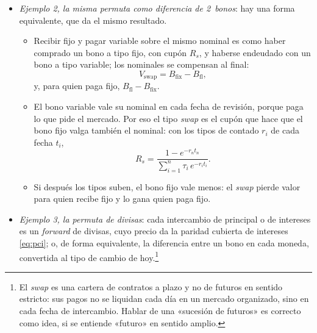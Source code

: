 \documentclass[11pt]{article}
\begin{document}
\begin{itemize}
\begin{itemize}
  \item El pago neto de cada fecha es el de \eqref{eq:pago-swap} con ese tipo, $\mathrm{VN}\,(R_{F,i}-R_s)\,\tau_i$, y el \emph{swap} vale la suma de esos pagos descontados.
  \item Si los tipos a plazo están por encima de $R_s$, el \emph{swap} tiene valor positivo para quien paga fijo; si están por debajo, para quien recibe fijo.
  \end{itemize}
\item \emph{Ejemplo 2, la misma permuta como diferencia de 2~bonos}: hay una forma equivalente, que da el mismo resultado\nocite{Hull2022Options}.
  \begin{itemize}
  \item Recibir fijo y pagar variable sobre el mismo nominal es como haber comprado un bono a tipo fijo, con cupón $R_s$, y haberse endeudado con un bono a tipo variable; los nominales se compensan al final:
  \begin{equation}\label{eq:valor-swap}
  V_{\mathrm{swap}}=B_{\mathrm{fix}}-B_{\mathrm{fl}},
  \end{equation}
  y, para quien paga fijo, $B_{\mathrm{fl}}-B_{\mathrm{fix}}$.
  \item El bono variable vale su nominal en cada fecha de revisión, porque paga lo que pide el mercado. Por eso el tipo \emph{swap} es el cupón que hace que el bono fijo valga también el nominal: con los tipos de contado $r_i$ de cada fecha $t_i$,
  \begin{equation}\label{eq:tipo-swap}
  R_s=\frac{1-e^{-r_nt_n}}{\sum_{i=1}^{n}\tau_i\,e^{-r_it_i}}.
  \end{equation}
  \item Si después los tipos suben, el bono fijo vale menos: el \emph{swap} pierde valor para quien recibe fijo y lo gana quien paga fijo.
  \end{itemize}
\item \emph{Ejemplo 3, la permuta de divisas}: cada intercambio de principal o de intereses es un \emph{forward} de divisas, cuyo precio da la paridad cubierta de intereses \eqref{eq:pci}; o, de forma equivalente, la diferencia entre un bono en cada moneda, convertida al tipo de cambio de hoy.\footnote{El \emph{swap} es una cartera de contratos a plazo y no de futuros en sentido estricto: sus pagos no se liquidan cada día en un mercado organizado, sino en cada fecha de intercambio. Hablar de una «sucesión de futuros» es correcto como idea, si se entiende «futuro» en sentido amplio.}
\end{itemize}
\end{document}
